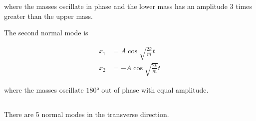 \documentclass{article}
\begin{document}
\begin{enumerate}
        where the masses oscillate in phase and the lower mass has an amplitude 3 times greater than the upper mass.

        The second normal mode is

        \begin{align*}
          x_1 & = A \cos \sqrt{\frac{2 k}{m}} t  \\
          x_2 & = -A \cos \sqrt{\frac{2 k}{m}} t
        \end{align*}

        where the masses oscillate $\ang{180}$ out of phase with equal amplitude.
\end{enumerate}

\subsection{}

There are 5 normal modes in the transverse direction.

\subsection{}
\end{document}
